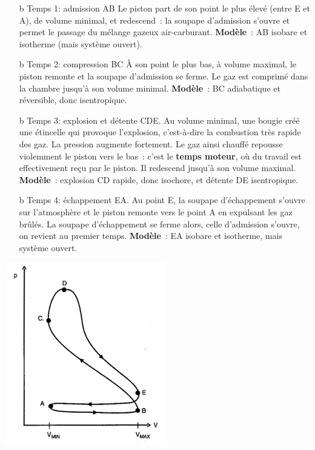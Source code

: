 \documentclass[../../main/main.tex]{subfiles}
\begin{document}
\begin{isd}
	\begin{itemize}
		\item[b]{Temps 1}: admission AB
		\smallbreak
		Le piston part de son point le plus élevé (entre E et A), de volume
		minimal, et redescend~: la soupape d'admission s'ouvre et permet le
		passage du mélange gazeux air-carburant.
		\smallbreak
		\textbf{Modèle}~: AB isobare et isotherme (mais système ouvert).
		\item[b]{Temps 2}: compression BC
		\smallbreak
		À son point le plus bas, à volume maximal, le piston remonte et la soupape
		d'admission se ferme. Le gaz est comprimé dans la chambre jusqu'à son
		volume minimal.
		\smallbreak
		\textbf{Modèle}~: BC adiabatique et réversible, donc isentropique.
		\item[b]{Temps 3}: explosion et détente CDE.
		\smallbreak
		Au volume minimal, une bougie créé une étincelle qui provoque l'explosion,
		c'est-à-dire la combustion très rapide des gaz. La pression augmente
		fortement. Le gaz ainsi chauffé repousse violemment le piston vers le
		bas~: c'est le \textbf{temps moteur}, où du travail est effectivement
		reçu par le piston. Il redescend jusqu'à son volume maximal.
		\smallbreak
		\textbf{Modèle}~: explosion CD rapide, donc isochore, et détente DE
		isentropique.
		\item[b]{Temps 4}: échappement EA.
		\smallbreak
		Au point E, la soupape d'échappement s'ouvre sur l'atmosphère et le piston
		remonte vers le point A en expulsant les gaz brûlés. La soupape
		d'échappement se ferme alors, celle d'admission s'ouvre, on revient au
		premier temps.
		\smallbreak
		\textbf{Modèle}~: EA isobare et isotherme, mais système ouvert.
	\end{itemize}
	\tcblower
	\begin{center}
		\includegraphics[width=\linewidth]{cycle_bdr}

\end{center}
\end{isd}
\end{document}
